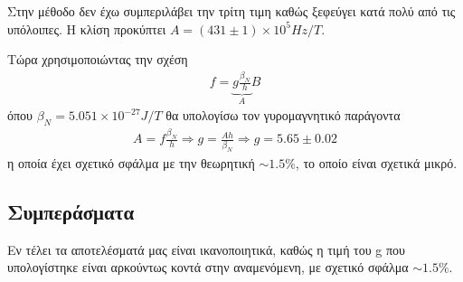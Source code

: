 \documentclass[a4paper]{article}
\begin{document}
Στην μέθοδο δεν έχω συμπεριλάβει την τρίτη τιμη καθώς ξεφεύγει κατά πολύ από τις υπόλοιπες. Η κλίση προκύπτει $A = (431\pm1)\times10^5Hz/T$.%


Τώρα χρησιμοποιώντας την σχέση 	
	\begin{align*}
		f= \underbrace{g\frac{\beta_N}{h}}_{A}B
	\end{align*}
		όπου $\beta_N=5.051\times10^{-27}J/T$ θα υπολογίσω τον γυρομαγνητικό παράγοντα 
	\begin{align*}
		A = f\frac{\beta_N}{h}\Rightarrow g = \frac{Ah}{\beta_N} \Rightarrow \boxed{g= 5.65\pm0.02}
	\end{align*}			
		η οποία έχει σχετικό σφάλμα με την θεωρητική $\sim1.5\%$, το οποίο είναι σχετικά μικρό.
\subsection*{Συμπεράσματα}


Εν τέλει τα αποτελέσματά μας είναι ικανοποιητικά, καθώς η τιμή του g που υπολογίστηκε είναι αρκούντως κοντά στην αναμενόμενη, με σχετικό σφάλμα $\sim1.5\%$.
\end{document}
